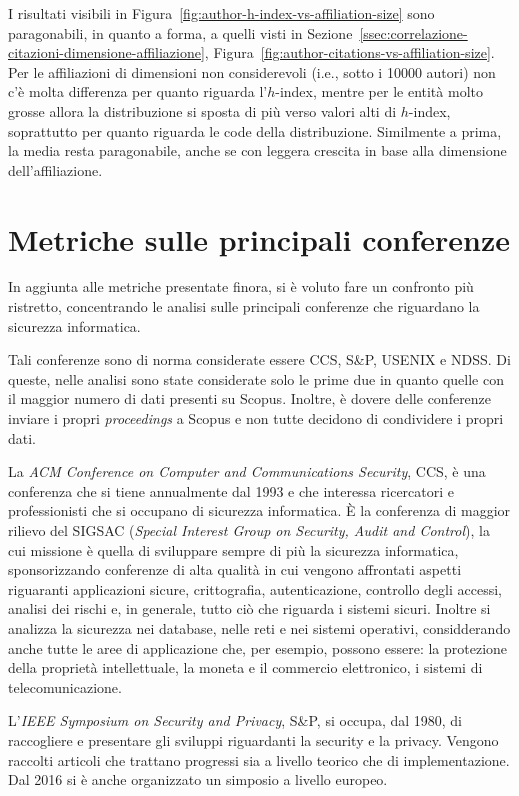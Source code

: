I risultati visibili in Figura~\ref{fig:author-h-index-vs-affiliation-size}
sono paragonabili, in quanto a forma, a quelli visti in
Sezione~\ref{ssec:correlazione-citazioni-dimensione-affiliazione},
Figura~\ref{fig:author-citations-vs-affiliation-size}.
Per le affiliazioni di dimensioni non considerevoli (i.e., sotto i 10000 autori)
non c'è molta differenza per quanto riguarda l'$h$-index, mentre per le entità
molto grosse allora la distribuzione si sposta di più verso valori alti di
$h$-index, soprattutto per quanto riguarda le code della distribuzione.
Similmente a prima, la media resta paragonabile, anche se con leggera crescita
in base alla dimensione dell'affiliazione.


\section{Metriche sulle principali conferenze}
In aggiunta alle metriche presentate finora, si è voluto fare un confronto più ristretto, concentrando le analisi sulle principali conferenze che riguardano la sicurezza informatica.

Tali conferenze sono di norma considerate essere CCS, S\&P, USENIX e NDSS. Di queste, nelle analisi sono state considerate solo le prime due in quanto quelle con il maggior numero di dati presenti su Scopus. Inoltre, è dovere delle conferenze inviare i propri \textit{proceedings} a Scopus e non tutte decidono di condividere i propri dati.

La \textit{ACM Conference on Computer and Communications Security}, CCS, è una conferenza che si tiene annualmente dal 1993 e che interessa ricercatori e professionisti che si occupano di sicurezza informatica. È la conferenza di maggior rilievo del SIGSAC (\textit{Special Interest Group on Security, Audit and Control}), la cui missione è quella di sviluppare sempre di più la sicurezza informatica, sponsorizzando conferenze di alta qualità in cui vengono affrontati aspetti riguaranti applicazioni sicure, crittografia, autenticazione, controllo degli accessi, analisi dei rischi e, in generale, tutto ciò che riguarda i sistemi sicuri. Inoltre si analizza la sicurezza nei database, nelle reti e nei sistemi operativi, considderando anche tutte le aree di applicazione che, per esempio, possono essere: la protezione della proprietà intellettuale, la moneta e il commercio elettronico, i sistemi di telecomunicazione. 

L'\textit{IEEE Symposium on Security and Privacy}, S\&P, si occupa, dal 1980, di raccogliere e presentare gli sviluppi riguardanti la security e la privacy. Vengono raccolti articoli che trattano progressi sia a livello teorico che di implementazione. Dal 2016 si è anche organizzato un simposio a livello europeo.

